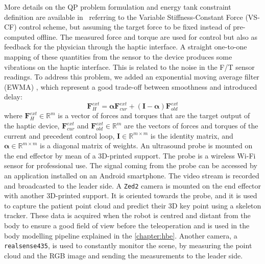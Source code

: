 More details on the QP problem formulation and energy tank constraint definition are available in~\cite{beber2023passive} referring to the Variable Stiffness-Constant Force (VS-CF) control scheme, but assuming the target force to be fixed instead of pre-computed offline.
The measured force and torque are used for control but also as feedback for the physician through the haptic interface. A straight one-to-one mapping of these quantities from the sensor to the device produces some vibrations on the haptic interface. This is related to the noise in the F/T sensor readings. To address this problem, we added an exponential moving average filter (EWMA) \cite{roberts1959}, which represent a good trade-off between smoothness and introduced delay:
\begin{equation}
    \boldsymbol{F}^{ext}_H = \boldsymbol{\alpha} \boldsymbol{F}^{ext}_{cur} + (\boldsymbol{I} - \boldsymbol{\alpha}) \boldsymbol{F}^{ext}_{old} 
\end{equation}
where $\boldsymbol{F}^{ext}_H \in \mathbb{R}^{m}$ is a vector of forces and torques that are the target output of the haptic device, $\boldsymbol{F}^{ext}_{cur}$ and $\boldsymbol{F}^{ext}_{old} \in \mathbb{R}^{m}$ are the vectors of forces and torques of the current and precedent control loop, $\boldsymbol{I} \in \mathbb{R}^{m \times m}$ is the identity matrix, and $\boldsymbol{\alpha} \in \mathbb{R}^{m \times m}$ is a diagonal matrix of weights. An ultrasound probe is mounted on the end effector by mean of a 3D-printed support. The probe is a wireless Wi-Fi sensor for professional use. The signal coming from the probe can be accessed by an application installed on an Android smartphone. The video stream is recorded and broadcasted to the leader side. A \verb|Zed2| camera is mounted on the end effector with another 3D-printed support. It is oriented towards the probe, and it is used to capture the patient point cloud and predict their 3D key point using a skeleton tracker. These data is acquired when the robot is centred and distant from the body to ensure a good field of view before the teleoperation and is used in the body modelling pipeline explained in the \autoref{chapter:hbe}. Another camera, a \verb|realsense435|, is used to constantly monitor the scene, by measuring the point cloud and the RGB image and sending the measurements to the leader side.
 


  
